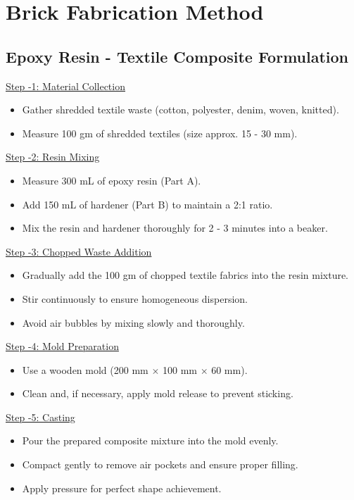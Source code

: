 \section{Brick Fabrication Method}

\subsection{Epoxy Resin - Textile Composite Formulation}

\noindent\underline{Step -1: Material Collection}
\begin{itemize}[leftmargin=1.5cm]
	\item Gather shredded textile waste (cotton, polyester, denim, woven, knitted).
	\item Measure 100 gm of shredded textiles (size approx. 15 - 30 mm).
\end{itemize}

\noindent\underline{Step -2: Resin Mixing }
\begin{itemize}[leftmargin=1.5cm]
	\item Measure 300 mL of epoxy resin (Part A).
	\item Add 150 mL of hardener (Part B) to maintain a 2:1 ratio.
	\item Mix the resin and hardener thoroughly for 2 - 3 minutes into a beaker.
\end{itemize}

\noindent\underline{Step -3: Chopped Waste Addition}
\begin{itemize}[leftmargin=1.5cm]
	\item Gradually add the 100 gm of chopped textile fabrics into the resin mixture.
	\item Stir continuously to ensure homogeneous dispersion.
	\item Avoid air bubbles by mixing slowly and thoroughly.
\end{itemize}

\noindent\underline{Step -4: Mold Preparation}
\begin{itemize}[leftmargin=1.5cm]
	\item Use a wooden mold (200 mm $\times$ 100 mm $\times$ 60 mm).
	\item Clean and, if necessary, apply mold release to prevent sticking.
\end{itemize}

\noindent\underline{Step -5: Casting}
\begin{itemize}[leftmargin=1.5cm]
	\item Pour the prepared composite mixture into the mold evenly.
	\item Compact gently to remove air pockets and ensure proper filling.
	\item Apply pressure for perfect shape achievement.
\end{itemize}

